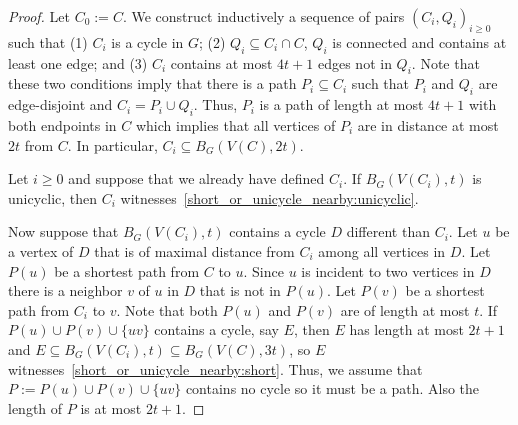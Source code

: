 \documentclass{patmorin}
\begin{document}
\begin{proof}
  Let $C_0:=C$.
  We construct inductively a sequence of pairs $(C_i,Q_i)_{i\geq0}$ such that 
  (1) $C_i$ is a cycle in $G$; 
  (2) $Q_i\subseteq C_i\cap C$, $Q_i$ is connected and contains at least one edge; and
  (3) $C_i$ contains at most $4t+1$ edges not in $Q_i$.
  Note that these two conditions imply that there is a path $P_i\subseteq C_i$  such that 
  $P_i$ and $Q_i$ are edge-disjoint and $C_i=P_i\cup Q_i$. 
  Thus, $P_i$ is a path of length at most $4t+1$ with both endpoints in $C$ 
  which implies that all vertices of $P_i$ are in distance at most $2t$ from $C$.
  In particular, $C_i\subseteq B_G(V(C),2t)$.

  Let $i\geq0$ and suppose that we already have defined $C_i$. 
  If $B_G(V(C_i),t)$ is unicyclic, then $C_i$ witnesses~\eqref{short_or_unicycle_nearby:unicyclic}. 

  Now suppose that $B_G(V(C_i),t)$ contains a cycle $D$ different than $C_i$. 
  Let $u$ be a vertex of $D$ that is of maximal distance from $C_i$ among all vertices in $D$. 
  Let $P(u)$ be a shortest path from $C$ to $u$. 
  Since $u$ is incident to two vertices in $D$ there is a neighbor $v$ of $u$ in $D$ that is not in $P(u)$.
  Let $P(v)$ be a shortest path from $C_i$ to $v$. 
  Note that both $P(u)$ and $P(v)$ are of length at most $t$. 
  If $P(u)\cup P(v)\cup\{uv\}$ contains a cycle, say $E$, then $E$ has length at most $2t+1$ and $E\subseteq B_G(V(C_i),t)\subseteq B_G(V(C),3t)$, so $E$ witnesses~\eqref{short_or_unicycle_nearby:short}. 
  Thus, we assume that $P:=P(u)\cup P(v)\cup\{uv\}$ contains no cycle so it must be a path. 
  Also the length of $P$ is at most $2t+1$.
  

\end{proof}
\end{document}
